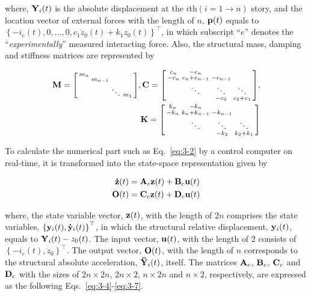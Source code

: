 where, $\mathbf{Y}_{i}(t)$ is the absolute displacement at the $i$th$\left(i=1\rightarrow n\right)$ story, and the location vector of external forces with the length of $n$, $\mathbf{p}(t)$  equals to $\left\{ -i_{e}(t),0,...,0,c_{1}\dot{z}_{0}(t)+k_{1}z_{0}(t)\right\}^{\top}$, in which subscript ``$e$'' denotes the ``\textit{experimentally}'' measured interacting force. Also, the structural mass, damping and stiffness matrices are represented by

\begin{equation}\label{eq:3-2}
\begin{aligned}
\mathbf{M}=\begin{bsmallmatrix}m_{n}&&&\\&m_{n-1}&&\\&&\ddots&m_{1}\end{bsmallmatrix},
\mathbf{C}=\begin{bsmallmatrix}c_{n}&-c_{n}&&\\-c_{n}&c_{n}+c_{n-1}&-c_{n-1}&\\ &\ddots&\ddots&\ddots\\&&-c_{2}&c_{2}+c_{1}\end{bsmallmatrix},\\
\mathbf{K}=\begin{bsmallmatrix}k_{n}&-k_{n}&&\\-k_{n}&k_{n}+k_{n-1}&-k_{n-1}&\\ &\ddots&\ddots&\ddots\\&&-k_{2}&k_{2}+k_{1}\end{bsmallmatrix}
\end{aligned}
\end{equation}

To calculate the numerical part such as Eq.~\eqref{eq:3-2} by a control computer on real-time, it is transformed into the state-space representation given by

\begin{equation}\label{eq:3-3}
\begin{aligned}
\mathbf{\dot{z}}(t)&=\mathbf{A}_{c}\mathbf{z}(t)+\mathbf{B}_{c}\mathbf{u}(t)\\
\mathbf{O}(t)&=\mathbf{C}_{c}\mathbf{z}(t)+\mathbf{D}_{c}\mathbf{u}(t)
\end{aligned}
\end{equation}

where, the state variable vector, $\mathbf{z}(t)$, with the length of $2n$ comprises the state variables, $\left\{\mathbf{y}_{i}(t),\mathbf{\dot{y}}_{i}(t)\right\}^{\top}$, in which the structural relative displacement, $\mathbf{y}_{i}(t)$, equals to $\mathbf{Y}_{i}(t)-z_{0}(t)$. The input vector, $\mathbf{u}(t)$, with the length of 2 consists of $\left\{-i_{e}(t), \ddot{z}_{0}\right\}^{\top}$. The output vector, $\mathbf{O}(t)$, with the length of $n$ corresponds to the structural absolute acceleration, $\mathbf{\ddot{Y}}_{i}(t)$, itself. The matrices $\mathbf{A}_{c}$, $\mathbf{B}_{c}$, $\mathbf{C}_{c}$ and $\mathbf{D}_{c}$ with the sizes of $2n \times 2n$, $2n \times 2$, $n \times 2n$ and $n \times 2$, respectively, are expressed as the following Eqs.~\eqref{eq:3-4}-\eqref{eq:3-7}.

